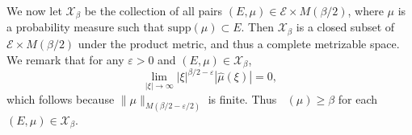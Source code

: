 \documentclass[12pt,reqno]{article}
\numberwithin{equation}{section}
\DeclareMathOperator{\fordim}{\dim_{\mathbf{F}}}
\newtheorem{theorem}{Theorem}
\numberwithin{theorem}{section}
\begin{document}
We now let $\mathcal{X}_\beta$ be the collection of all pairs $(E,\mu) \in \mathcal{E} \times M(\beta/2)$, where $\mu$ is a probability measure such that $\text{supp}(\mu) \subset E$. Then $\mathcal{X}_\beta$ is a closed subset of $\mathcal{E} \times M(\beta/2)$ under the product metric, and thus a complete metrizable space. We remark that for any $\varepsilon > 0$ and $(E,\mu) \in \mathcal{X}_\beta$,
%
\begin{equation} \label{equationGFSCSC4}
    \lim_{|\xi| \to \infty} |\xi|^{\beta/2 - \varepsilon} |\widehat{\mu}(\xi)| = 0,
\end{equation}
%
which follows because $\| \mu \|_{M(\beta/2 - \varepsilon/2)}$ is finite. Thus $\fordim(\mu) \geq \beta$ for each $(E,\mu) \in \mathcal{X}_\beta$.
\begin{comment}
\begin{theorem}
    $\mathcal{X}$ is a closed subset of $\mathcal{E} \times M(\beta)$.
\end{theorem}
\begin{proof}
    Suppose $\{ (E_k,\mu_k) \}$ is a sequence of elements of $\mathcal{X}$ converging to some tuple $(E,\mu) \in \mathcal{E} \times M(\beta)$. Fix $\varepsilon > 0$. Since $E_k \to E$ in the Hausdorff dimension, there exists $k_0$ such that for $k \geq k_0$, $E_k \subset E(\varepsilon)$. Since $\mu_k \to \mu$ weakly, this implies that $\mu$ is a probability measure, and that $\text{supp}(\mu) \subset E(\varepsilon)$. Taking $\varepsilon \to 0$ shows that $\text{supp}(\mu) \subset E$. Again for a fixed $\varepsilon > 0$, applying the triangle inequality and the reverse triangle inequality combined with \eqref{equationGFSCSC4} applied to $\mu_k$, we conclude
    \[ \lim_{|\xi| \to \infty} |\xi|^{\beta/2 - \varepsilon} |\widehat{\mu}(\xi)| = \lim_{|\xi| \to \infty} |\xi|^{\beta/2 - \varepsilon} |\widehat{\mu}(\xi) - \widehat{\mu_k}(\xi)| \leq \| \mu - \mu_k \|_{M(\beta,\varepsilon)}. \]
    Taking $k \to \infty$ shows that
    \[ \lim_{|\xi| \to \infty} |\xi|^{\beta/2 - \varepsilon} |\widehat{\mu}(\xi)| = 0, \]
    which completes the proof.
\end{proof}
\end{comment}
\end{document}
